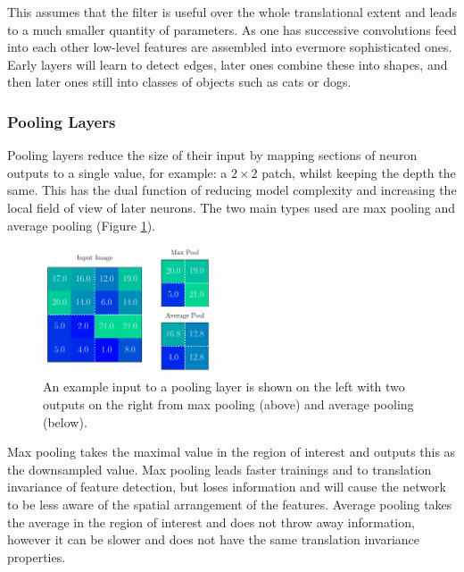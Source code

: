 This assumes that the filter is useful over the whole translational extent and leads to a much smaller quantity of parameters. As one has successive convolutions feed into each other low-level features are assembled into evermore sophisticated ones. Early layers will learn to detect edges, later ones combine these into shapes, and then later ones still into classes of objects such as cats or dogs. 


\subsubsection{Pooling Layers}
Pooling layers reduce the size of their input by mapping sections of neuron outputs to a single value, for example: a $2\times{}2$ patch, whilst keeping the depth the same.
This has the dual function of reducing model complexity and increasing the local field of view of later neurons. 
The two main types used are max pooling and average pooling (Figure \ref{fig:machine_learning:pooling}). 
\begin{figure}[h!]
    \includegraphics[width=0.45\textwidth]{figures/machine_learning/pooling.pdf}
    \caption{An example input to a pooling layer is shown on the left with two outputs on the right from max pooling (above) and average pooling (below).}
        \label{fig:machine_learning:pooling}
\end{figure}

Max pooling takes the maximal value in the region of interest and outputs this as the downsampled value. Max pooling leads faster trainings and to translation invariance of feature detection, but loses information and will cause the network to be less aware of the spatial arrangement of the features. 
Average pooling takes the average in the region of interest and does not throw away information, however it can be slower and does not have the same translation invariance properties. 


